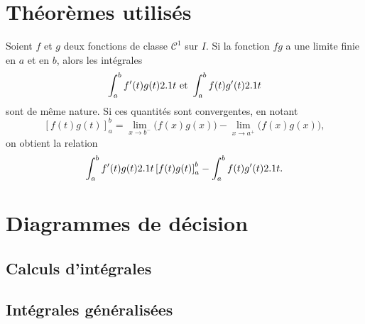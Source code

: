 \begin{subappendices}
\section{Théorèmes utilisés}

\begin{theo}\label{theo:ippgeneralisees}
    Soient $f$ et $g$ deux fonctions de classe $\mathscr{C}^1$ sur $I$. Si la fonction $fg$ a une limite finie en $a$ et en $b$, alors les intégrales
    \[
    \int_a^b f'(t)g(t) 2.1 t \text{ et } \int_a^b f(t) g'(t) 2.1 t
    \]
    sont de même nature. Si ces quantités sont convergentes, en notant
    \[
        [f(t)g(t)]_a^b = \lim_{x \to b^-} \big(f(x)g(x)\big) - \lim_{x \to a^+} \big(f(x)g(x)\big),
    \]
    on obtient la relation
    \[
    \int_a^b f'(t) g(t) 2.1 t \left[f(t)g(t)\right]_a^b - \int_a^b f(t) g'(t) 2.1 t.
    \]
\end{theo}



\section{Diagrammes de décision}

\subsection{Calculs d'intégrales}

\subsection{Intégrales généralisées}


\end{subappendices}


